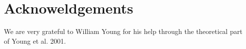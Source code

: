 


\section*{Acknoweldgements}
We are very grateful to William Young for his help through the theoretical part of Young et al. 2001. 
